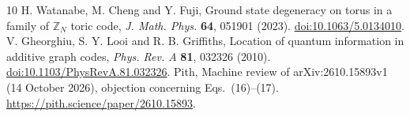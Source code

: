 \documentclass[11pt]{article}
\begin{document}
\begin{thebibliography}{10}
 H. Watanabe, M. Cheng and Y. Fuji, Ground state degeneracy on torus in a family of $\mathbb Z_N$ toric code, \emph{J. Math. Phys.} \textbf{64}, 051901 (2023). \href{https://doi.org/10.1063/5.0134010}{doi:10.1063/5.0134010}.
 V. Gheorghiu, S. Y. Looi and R. B. Griffiths, Location of quantum information in additive graph codes, \emph{Phys. Rev. A} \textbf{81}, 032326 (2010). \href{https://doi.org/10.1103/PhysRevA.81.032326}{doi:10.1103/PhysRevA.81.032326}.
 Pith, Machine review of arXiv:2610.15893v1 (14 October 2026), objection concerning Eqs.~(16)--(17). \url{https://pith.science/paper/2610.15893}.
\end{thebibliography}
\end{document}
